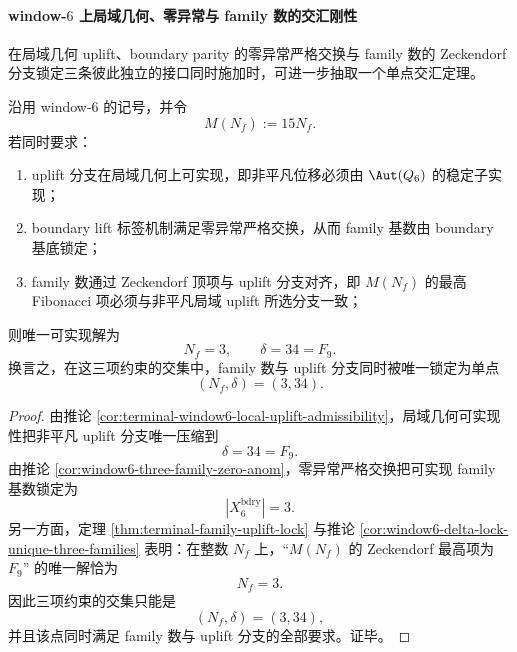 \paragraph{window-\(6\) 上局域几何、零异常与 family 数的交汇刚性}
在局域几何 uplift、boundary parity 的零异常严格交换与 family 数的 Zeckendorf 分支锁定三条彼此独立的接口同时施加时，可进一步抽取一个单点交汇定理。

\begin{theorem}\label{thm:window6-local-geometry-zero-anomaly-family-unique-intersection}
沿用 window-\(6\) 的记号，并令
\[
M(N_f):=15N_f.
\]
若同时要求：
\begin{enumerate}
  \item uplift 分支在局域几何上可实现，即非平凡位移必须由 \(\Aut(Q_6)\) 的稳定子实现；
  \item boundary lift 标签机制满足零异常严格交换，从而 family 基数由 boundary 基底锁定；
  \item family 数通过 Zeckendorf 顶项与 uplift 分支对齐，即 \(M(N_f)\) 的最高 Fibonacci 项必须与非平凡局域 uplift 所选分支一致；
\end{enumerate}
则唯一可实现解为
\[
\boxed{\;
N_f=3,\qquad \delta=34=F_9.\;}
\]
换言之，在这三项约束的交集中，family 数与 uplift 分支同时被唯一锁定为单点
\[
(N_f,\delta)=(3,34).
\]
\end{theorem}

\begin{proof}
由推论 \ref{cor:terminal-window6-local-uplift-admissibility}，局域几何可实现性把非平凡 uplift 分支唯一压缩到
\[
\delta=34=F_9.
\]
由推论 \ref{cor:window6-three-family-zero-anom}，零异常严格交换把可实现 family 基数锁定为
\[
|X_6^{\mathrm{bdry}}|=3.
\]
另一方面，定理 \ref{thm:terminal-family-uplift-lock} 与推论
\ref{cor:window6-delta-lock-unique-three-families} 表明：在整数 \(N_f\) 上，“\(M(N_f)\) 的 Zeckendorf 最高项为 \(F_9\)” 的唯一解恰为
\[
N_f=3.
\]
因此三项约束的交集只能是
\[
(N_f,\delta)=(3,34),
\]
并且该点同时满足 family 数与 uplift 分支的全部要求。证毕。
\end{proof}
